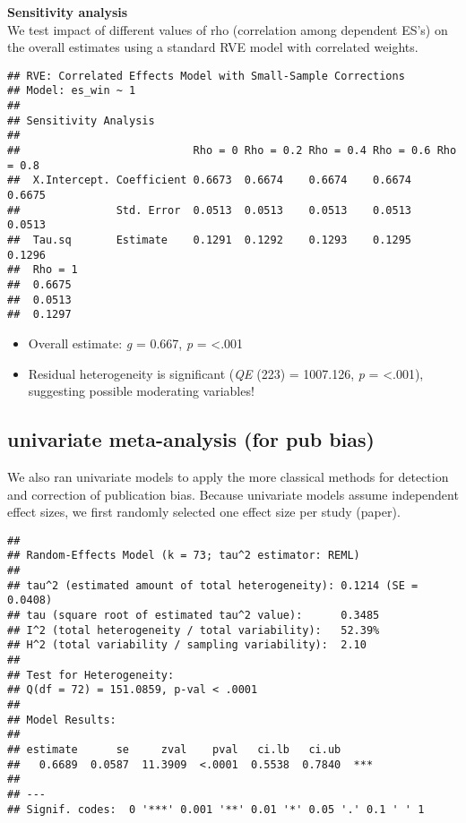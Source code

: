 \documentclass[
]{book}
\begin{document}
\textbf{Sensitivity analysis}\\
We test impact of different values of rho (correlation among dependent ES's) on the
overall estimates using a standard RVE model with correlated weights.

\begin{verbatim}
## RVE: Correlated Effects Model with Small-Sample Corrections 
## Model: es_win ~ 1 
## 
## Sensitivity Analysis 
## 
##                           Rho = 0 Rho = 0.2 Rho = 0.4 Rho = 0.6 Rho = 0.8
##  X.Intercept. Coefficient 0.6673  0.6674    0.6674    0.6674    0.6675   
##               Std. Error  0.0513  0.0513    0.0513    0.0513    0.0513   
##  Tau.sq       Estimate    0.1291  0.1292    0.1293    0.1295    0.1296   
##  Rho = 1
##  0.6675 
##  0.0513 
##  0.1297
\end{verbatim}

\begin{itemize}
\item
  Overall estimate: \emph{g} = 0.667, \emph{p} = \textless.001
\item
  Residual heterogeneity is significant (\emph{QE} (223) = 1007.126,
  \emph{p} = \textless.001), suggesting possible moderating variables!
\end{itemize}

\hypertarget{univariate-meta-analysis-for-pub-bias}{%
\subsection{univariate meta-analysis (for pub bias)}\label{univariate-meta-analysis-for-pub-bias}}

We also ran univariate models to apply the more classical methods for
detection and correction of publication bias. Because univariate models assume
independent effect sizes, we first randomly selected one effect size per study (paper).

\begin{verbatim}
## 
## Random-Effects Model (k = 73; tau^2 estimator: REML)
## 
## tau^2 (estimated amount of total heterogeneity): 0.1214 (SE = 0.0408)
## tau (square root of estimated tau^2 value):      0.3485
## I^2 (total heterogeneity / total variability):   52.39%
## H^2 (total variability / sampling variability):  2.10
## 
## Test for Heterogeneity:
## Q(df = 72) = 151.0859, p-val < .0001
## 
## Model Results:
## 
## estimate      se     zval    pval   ci.lb   ci.ub 
##   0.6689  0.0587  11.3909  <.0001  0.5538  0.7840  *** 
## 
## ---
## Signif. codes:  0 '***' 0.001 '**' 0.01 '*' 0.05 '.' 0.1 ' ' 1
\end{verbatim}
\end{document}
